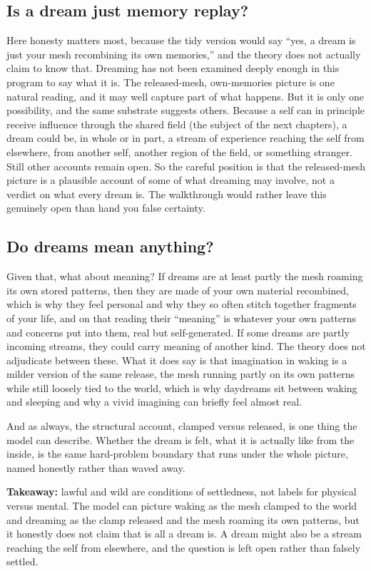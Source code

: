 \subsection{Is a dream just memory replay?}

Here honesty matters most, because the tidy version would say ``yes, a dream is just your mesh recombining its own memories,'' and the theory does not actually claim to know that. Dreaming has not been examined deeply enough in this program to say what it is. The released-mesh, own-memories picture is one natural reading, and it may well capture part of what happens. But it is only one possibility, and the same substrate suggests others. Because a self can in principle receive influence through the shared field (the subject of the next chapters), a dream could be, in whole or in part, a stream of experience reaching the self from elsewhere, from another self, another region of the field, or something stranger. Still other accounts remain open. So the careful position is that the released-mesh picture is a plausible account of some of what dreaming may involve, not a verdict on what every dream is. The walkthrough would rather leave this genuinely open than hand you false certainty.

\subsection{Do dreams mean anything?}

Given that, what about meaning? If dreams are at least partly the mesh roaming its own stored patterns, then they are made of your own material recombined, which is why they feel personal and why they so often stitch together fragments of your life, and on that reading their ``meaning'' is whatever your own patterns and concerns put into them, real but self-generated. If some dreams are partly incoming streams, they could carry meaning of another kind. The theory does not adjudicate between these. What it does say is that imagination in waking is a milder version of the same release, the mesh running partly on its own patterns while still loosely tied to the world, which is why daydreams sit between waking and sleeping and why a vivid imagining can briefly feel almost real.

And as always, the structural account, clamped versus released, is one thing the model can describe. Whether the dream is felt, what it is actually like from the inside, is the same hard-problem boundary that runs under the whole picture, named honestly rather than waved away.

\textbf{Takeaway:} lawful and wild are conditions of settledness, not labels for physical versus mental. The model can picture waking as the mesh clamped to the world and dreaming as the clamp released and the mesh roaming its own patterns, but it honestly does not claim that is all a dream is. A dream might also be a stream reaching the self from elsewhere, and the question is left open rather than falsely settled.
